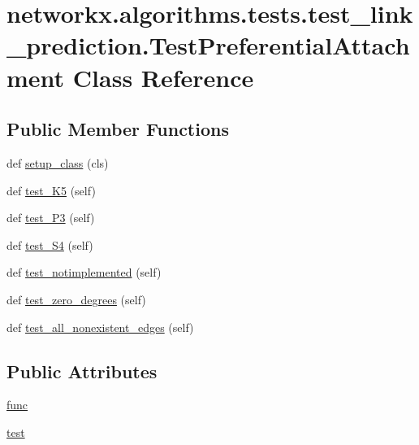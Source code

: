 \hypertarget{classnetworkx_1_1algorithms_1_1tests_1_1test__link__prediction_1_1TestPreferentialAttachment}{}\section{networkx.\+algorithms.\+tests.\+test\+\_\+link\+\_\+prediction.\+Test\+Preferential\+Attachment Class Reference}
\label{classnetworkx_1_1algorithms_1_1tests_1_1test__link__prediction_1_1TestPreferentialAttachment}
\subsection*{Public Member Functions}
\begin{DoxyCompactItemize}
\item 
def \hyperlink{classnetworkx_1_1algorithms_1_1tests_1_1test__link__prediction_1_1TestPreferentialAttachment_a0fd1acefb2e9b9093e8b53f8e91ddf9f}{setup\+\_\+class} (cls)
\item 
def \hyperlink{classnetworkx_1_1algorithms_1_1tests_1_1test__link__prediction_1_1TestPreferentialAttachment_af9fc50b43dd2fbf05134fc9916152107}{test\+\_\+\+K5} (self)
\item 
def \hyperlink{classnetworkx_1_1algorithms_1_1tests_1_1test__link__prediction_1_1TestPreferentialAttachment_ac5a9917bad718e0831a5653c86112321}{test\+\_\+\+P3} (self)
\item 
def \hyperlink{classnetworkx_1_1algorithms_1_1tests_1_1test__link__prediction_1_1TestPreferentialAttachment_a5dc6a0394146b47c028feb65f5ef55df}{test\+\_\+\+S4} (self)
\item 
def \hyperlink{classnetworkx_1_1algorithms_1_1tests_1_1test__link__prediction_1_1TestPreferentialAttachment_a66d629a97d321d3147b6b800330b22d0}{test\+\_\+notimplemented} (self)
\item 
def \hyperlink{classnetworkx_1_1algorithms_1_1tests_1_1test__link__prediction_1_1TestPreferentialAttachment_a38dc6c4c3ab30391569eb6df6c493038}{test\+\_\+zero\+\_\+degrees} (self)
\item 
def \hyperlink{classnetworkx_1_1algorithms_1_1tests_1_1test__link__prediction_1_1TestPreferentialAttachment_afcae3d75a05f051cf655baa36afd1edb}{test\+\_\+all\+\_\+nonexistent\+\_\+edges} (self)
\end{DoxyCompactItemize}
\subsection*{Public Attributes}
\begin{DoxyCompactItemize}
\item 
\hyperlink{classnetworkx_1_1algorithms_1_1tests_1_1test__link__prediction_1_1TestPreferentialAttachment_a0f32ccd12744ae635f22f74e8fe8516f}{func}
\item 
\hyperlink{classnetworkx_1_1algorithms_1_1tests_1_1test__link__prediction_1_1TestPreferentialAttachment_a818b4abd124e5f7bb7d7e1ee3ef55acb}{test}
\end{DoxyCompactItemize}


